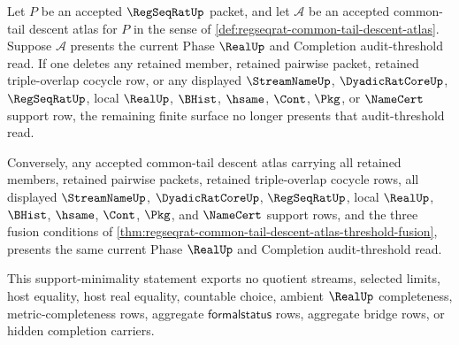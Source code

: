 \begin{theorem}
\label{thm:regseqrat-common-tail-descent-atlas-support-minimality}
Let $P$ be an accepted $\RegSeqRatUp$ packet, and let $\mathcal A$ be an accepted common-tail descent atlas for $P$ in the sense of \autoref{def:regseqrat-common-tail-descent-atlas}. Suppose $\mathcal A$ presents the current Phase $\RealUp$ and Completion audit-threshold read. If one deletes any retained member, retained pairwise packet, retained triple-overlap cocycle row, or any displayed $\StreamNameUp$, $\DyadicRatCoreUp$, $\RegSeqRatUp$, local $\RealUp$, $\BHist$, $\hsame$, $\Cont$, $\Pkg$, or $\NameCert$ support row, the remaining finite surface no longer presents that audit-threshold read.

Conversely, any accepted common-tail descent atlas carrying all retained members, retained pairwise packets, retained triple-overlap cocycle rows, all displayed $\StreamNameUp$, $\DyadicRatCoreUp$, $\RegSeqRatUp$, local $\RealUp$, $\BHist$, $\hsame$, $\Cont$, $\Pkg$, and $\NameCert$ support rows, and the three fusion conditions of \autoref{thm:regseqrat-common-tail-descent-atlas-threshold-fusion}, presents the same current Phase $\RealUp$ and Completion audit-threshold read.

This support-minimality statement exports no quotient streams, selected limits, host equality, host real equality, countable choice, ambient $\RealUp$ completeness, metric-completeness rows, aggregate $\mathsf{formalstatus}$ rows, aggregate bridge rows, or hidden completion carriers.
\end{theorem}
